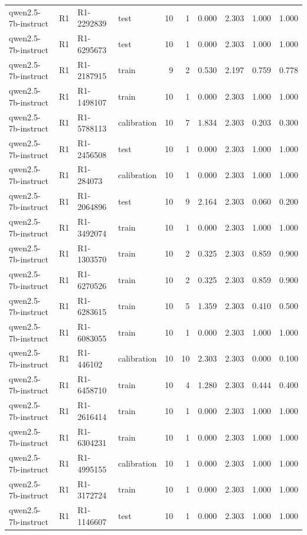 \begin{table}
\begin{tabular}{llllrrrrrr}
qwen2.5-7b-instruct & R1 & R1-2292839 & test & 10 & 1 & 0.000 & 2.303 & 1.000 & 1.000 \\
qwen2.5-7b-instruct & R1 & R1-6295673 & test & 10 & 1 & 0.000 & 2.303 & 1.000 & 1.000 \\
qwen2.5-7b-instruct & R1 & R1-2187915 & train & 9 & 2 & 0.530 & 2.197 & 0.759 & 0.778 \\
qwen2.5-7b-instruct & R1 & R1-1498107 & train & 10 & 1 & 0.000 & 2.303 & 1.000 & 1.000 \\
qwen2.5-7b-instruct & R1 & R1-5788113 & calibration & 10 & 7 & 1.834 & 2.303 & 0.203 & 0.300 \\
qwen2.5-7b-instruct & R1 & R1-2456508 & test & 10 & 1 & 0.000 & 2.303 & 1.000 & 1.000 \\
qwen2.5-7b-instruct & R1 & R1-284073 & calibration & 10 & 1 & 0.000 & 2.303 & 1.000 & 1.000 \\
qwen2.5-7b-instruct & R1 & R1-2064896 & test & 10 & 9 & 2.164 & 2.303 & 0.060 & 0.200 \\
qwen2.5-7b-instruct & R1 & R1-3492074 & train & 10 & 1 & 0.000 & 2.303 & 1.000 & 1.000 \\
qwen2.5-7b-instruct & R1 & R1-1303570 & train & 10 & 2 & 0.325 & 2.303 & 0.859 & 0.900 \\
qwen2.5-7b-instruct & R1 & R1-6270526 & train & 10 & 2 & 0.325 & 2.303 & 0.859 & 0.900 \\
qwen2.5-7b-instruct & R1 & R1-6283615 & train & 10 & 5 & 1.359 & 2.303 & 0.410 & 0.500 \\
qwen2.5-7b-instruct & R1 & R1-6083055 & train & 10 & 1 & 0.000 & 2.303 & 1.000 & 1.000 \\
qwen2.5-7b-instruct & R1 & R1-446102 & calibration & 10 & 10 & 2.303 & 2.303 & 0.000 & 0.100 \\
qwen2.5-7b-instruct & R1 & R1-6458710 & train & 10 & 4 & 1.280 & 2.303 & 0.444 & 0.400 \\
qwen2.5-7b-instruct & R1 & R1-2616414 & train & 10 & 1 & 0.000 & 2.303 & 1.000 & 1.000 \\
qwen2.5-7b-instruct & R1 & R1-6304231 & train & 10 & 1 & 0.000 & 2.303 & 1.000 & 1.000 \\
qwen2.5-7b-instruct & R1 & R1-4995155 & calibration & 10 & 1 & 0.000 & 2.303 & 1.000 & 1.000 \\
qwen2.5-7b-instruct & R1 & R1-3172724 & train & 10 & 1 & 0.000 & 2.303 & 1.000 & 1.000 \\
qwen2.5-7b-instruct & R1 & R1-1146607 & test & 10 & 1 & 0.000 & 2.303 & 1.000 & 1.000 \\

\end{tabular}
\end{table}
